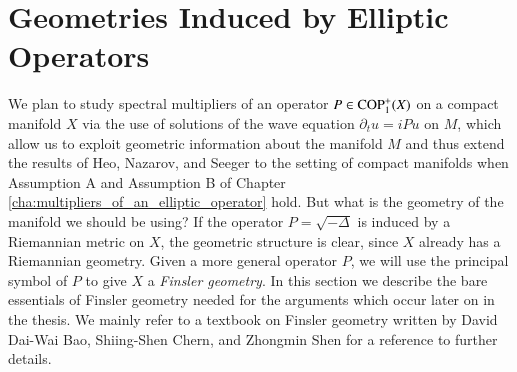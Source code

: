 
\section{Geometries Induced by Elliptic Operators} \label{sec:geometriesinduced}

We plan to study spectral multipliers of an operator $P \in {\text{COP}^{+}_{{1}}}(X)$ on a compact manifold $X$ via the use of solutions of the wave equation $\partial_t u = i P u$ on $M$, which allow us to exploit geometric information about the manifold $M$ and thus extend the results of Heo, Nazarov, and Seeger to the setting of compact manifolds when Assumption A and Assumption B of Chapter \ref{cha:multipliers_of_an_elliptic_operator} hold. But what is the geometry of the manifold we should be using? If the operator $P = \sqrt{-\Delta}$ is induced by a Riemannian metric on $X$, the geometric structure is clear, since $X$ already has a Riemannian geometry. Given a more general operator $P$, we will use the principal symbol of $P$ to give $X$ a \emph{Finsler geometry}. In this section we describe the bare essentials of Finsler geometry needed for the arguments which occur later on in the thesis. We mainly refer to a textbook on Finsler geometry written by David Dai-Wai Bao, Shiing-Shen Chern, and Zhongmin Shen \cite{BaoChern} for a reference to further details.

